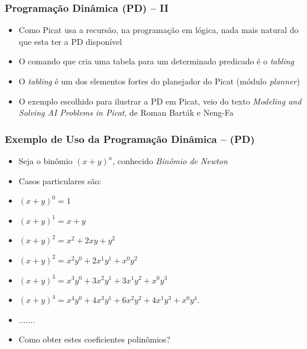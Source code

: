 \begin{frame}[fragile]

    \frametitle{Programação Dinâmica (PD) -- II}

   \begin{block}{}
     \begin{itemize}

      \item Como Picat usa a recursão, na programação em lógica, nada mais
      natural do que esta ter a PD disponível 

       \pause
       \item O comando que cria uma tabela para um determinado predicado é o  \textit{tabling}
 
        \pause
       \item O \textit{tabling}  é um dos elementos fortes do planejador do Picat (módulo \textit{planner})


        \pause
       \item O exemplo escolhido para ilustrar a PD em Picat, veio do texto \textit{Modeling and Solving AI
        Problems in Picat}, de Roman Barták e Neng-Fa
    \end{itemize}
    
    \end{block}
    
\end{frame}



\begin{frame}[fragile]

\frametitle{Exemplo de Uso da Programação Dinâmica -- (PD)}



\begin{itemize}
  \item Seja o binômio ${\left(x + y\right)}^n$, conhecido \textit{Binômio de Newton}

  \pause 
  \item Casos particulares são:
  \item  ${\left(x + y\right)}^0 = 1$
  \item  ${\left(x + y\right)}^1 = x + y$
  \item  ${\left(x + y\right)}^2 = x^2 + 2xy + y^2$
  
  \pause
  \item  ${\left(x + y\right)}^2 = x^2y^0 + 2x^1y^1 + x^0y^2$
  \item  ${\left(x + y\right)}^3 = x^3y^0 + 3x^2y^1 + 3x^1y^2 + x^0y^3$
  \item  ${\left(x + y\right)}^4 = x^4y^0 + 4x^3y^1 + 6x^2y^2 + 4x^1y^3 + x^0y^4.$
    \item  .......
    \pause
 \item Como obter estes coeficientes  polinômios?  

\end{itemize}

    
\end{frame}



